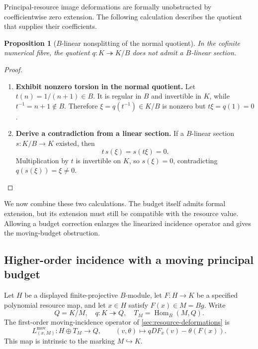 \documentclass[11pt,a4paper]{article}
\numberwithin{algorithm}{section}
\numberwithin{equation}{section}
\newtheorem{proposition}[proposition]{Proposition}
\theoremstyle{definition}
\theoremstyle{remark}
\theoremstyle{plain}
\newcommand{\incl}{\hookrightarrow}
\newcommand{\onto}{\twoheadrightarrow}
\newcommand{\Hom}{\operatorname{Hom}}
\theoremstyle{definition}
\theoremstyle{plain}
\begin{document}
Principal-resource image deformations are formally unobstructed by
coefficientwise zero extension. The following calculation describes
the quotient that supplies their coefficients.

\begin{proposition}[$B$-linear nonsplitting of the normal quotient]
\label{prop:no-formal-representative-selector}
In the cofinite numerical fibre, the quotient
$q:K\twoheadrightarrow K/B$ does not admit a $B$-linear
section.
\end{proposition}
\begin{proof}\leavevmode
\begin{enumerate}[leftmargin=*,align=left]
\item \textbf{Exhibit nonzero torsion in the normal quotient.}
Let $t(n)=1/(n+1)\in B$.  It is regular in $B$ and
invertible in $K$, while $t^{-1}=n+1\notin B$.  Therefore
$\xi=q(t^{-1})\in K/B$ is nonzero but
$t\xi=q(1)=0$.

\item \textbf{Derive a contradiction from a linear section.}
If a $B$-linear section
$s:K/B\to K$ existed, then
\[
 t\,s(\xi)=s(t\xi)=0.
\]
Multiplication by $t$ is invertible on $K$, so
$s(\xi)=0$, contradicting
$q(s(\xi))=\xi\ne0$.
\end{enumerate}
\end{proof}

We now combine these two calculations. The budget itself admits
formal extension, but its extension must still be compatible
with the resource value. Allowing a budget correction enlarges
the linearized incidence operator and gives the moving-budget
obstruction.

\subsection{Higher-order incidence with a moving principal budget}
\label{sec:moving-higher-order}
Let $H$ be a displayed finite-projective $B$-module, let
$F:H\to K$ be a specified polynomial resource map, and let
$x\in H$ satisfy $F(x)\in M=Bg$.  Write
\[
 Q=K/M,\quad q:K\onto Q,\quad
 T_M=\Hom_B(M,Q).
\]
The first-order moving-incidence operator of
\cref{sec:resource-deformations} is
\begin{equation}\label{eq:moving-incidence-linear}
 L^{\mathrm{mov}}_{(x,M)}:
   H\oplus T_M\longrightarrow Q,\qquad
 (v,\theta)\longmapsto qDF_x(v)-\theta(F(x)).
\end{equation}
This map is intrinsic to the marking $M\incl K$.
\end{document}
